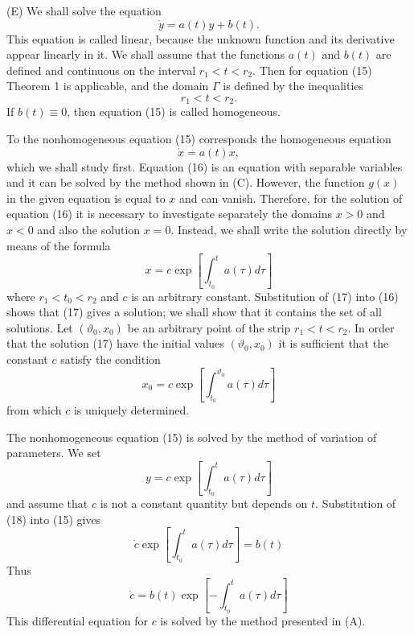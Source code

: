 \documentclass[10pt,a5paper]{book}
\theoremstyle{plain}
\theoremstyle{definition}
\theoremstyle{remark}
\begin{document}
(E) We shall solve the equation
\begin{equation*}
\dot{y}=a(t) y+b(t) . \tag{15}
\end{equation*}
This equation is called linear, because the unknown function and its derivative appear linearly in it. We shall assume that the functions $a(t)$ and $b(t)$ are defined and continuous on the interval $r_{1}<t<r_{2}$. Then for equation (15) Theorem 1 is applicable, and the domain $\Gamma$ is defined by the inequalities
\[
r_{1}<t<r_{2} .
\]
If $b(t) \equiv 0$, then equation (15) is called homogeneous.

To the nonhomogeneous equation (15) corresponds the homogeneous equation
\begin{equation*}
\dot{x}=a(t) x, \tag{16}
\end{equation*}
which we shall study first. Equation (16) is an equation with separable variables and it can be solved by the method shown in (C). However, the function $g(x)$ in the given equation is equal to $x$ and can vanish. Therefore, for the solution of equation (16) it is necessary to investigate separately the domains $x>0$ and $x<0$ and also the solution $x=0$. Instead, we shall write the solution directly by means of the formula
\begin{equation*}
x=c \exp \left[\int_{t_{0}}^{t} a(\tau) d \tau\right] \tag{17}
\end{equation*}
where $r_{1}<t_{0}<r_{2}$ and $c$ is an arbitrary constant. Substitution of (17) into (16) shows that (17) gives a solution; we shall show that it contains the set of all solutions. Let $\left(\vartheta_{0}, x_{0}\right)$ be an arbitrary point of the strip $r_{1}<t<r_{2}$. In order that the solution (17) have the initial values $\left(\vartheta_{0}, x_{0}\right)$
it is sufficient that the constant $c$ satisfy the condition
\[
x_{0}=c \exp \left[\int_{t_{0}}^{\vartheta_{0}} a(\tau) d \tau\right]
\]
from which $c$ is uniquely determined.

The nonhomogeneous equation (15) is solved by the method of variation of parameters. We set
\begin{equation*}
y=c \exp \left[\int_{t_{0}}^{t} a(\tau) d \tau\right] \tag{18}
\end{equation*}
and assume that $c$ is not a constant quantity but depends on $t$. Substitution of (18) into (15) gives
\begin{equation*}
\dot{c} \exp \left[\int_{t_{0}}^{t} a(\tau) d \tau\right]=b(t) \tag{19}
\end{equation*}
Thus
\[
\dot{c}=b(t) \exp \left[-\int_{t_{0}}^{t} a(\tau) d \tau\right]
\]
This differential equation for $c$ is solved by the method presented in (A).
\end{document}

